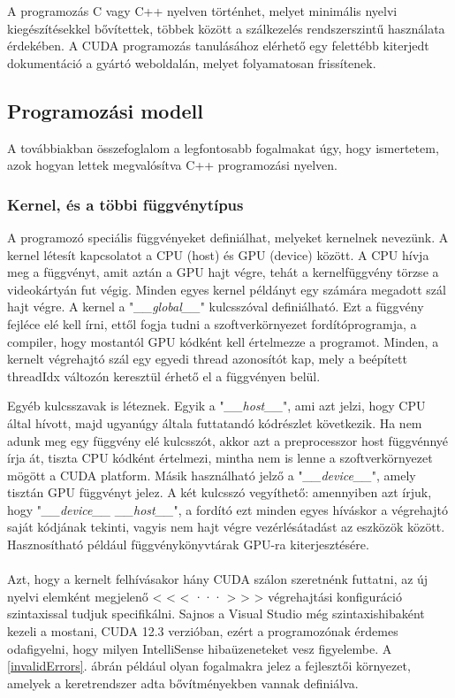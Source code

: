 A programozás C vagy C++ nyelven történhet, melyet minimális nyelvi kiegészítésekkel bővítettek, többek között a szálkezelés rendszerszintű használata érdekében. A CUDA programozás tanulásához elérhető egy felettébb kiterjedt dokumentáció a gyártó weboldalán, melyet folyamatosan frissítenek. \cite{CUDAdoc}

\subsection{Programozási modell }
A továbbiakban összefoglalom a legfontosabb fogalmakat úgy, hogy ismertetem, azok hogyan lettek megvalósítva C++ programozási nyelven.

\subsubsection{Kernel, és a többi függvénytípus}
A programozó speciális függvényeket definiálhat, melyeket kernelnek nevezünk. A kernel létesít kapcsolatot a CPU (host) és GPU (device) között. A CPU hívja meg a függvényt, amit aztán a GPU hajt végre, tehát a kernelfüggvény törzse a videokártyán fut végig. Minden egyes kernel példányt egy számára megadott szál hajt végre.
A kernel a "\textit{\_\_global\_\_}" kulcsszóval definiálható. Ezt a függvény fejléce elé kell írni, ettől fogja tudni a szoftverkörnyezet fordítóprogramja, a compiler, hogy mostantól GPU kódként kell értelmezze a programot. Minden, a kernelt végrehajtó szál egy egyedi thread azonosítót kap, mely a beépített threadIdx változón keresztül érhető el a függvényen belül.

Egyéb kulcsszavak is léteznek. Egyik a "\textit{\_\_host\_\_}", ami azt jelzi, hogy CPU által hívott, majd ugyanúgy általa futtatandó kódrészlet következik. Ha nem adunk meg egy függvény elé kulcsszót, akkor azt a preprocesszor host függvénnyé írja át, tiszta CPU kódként értelmezi, mintha nem is lenne a szoftverkörnyezet mögött a CUDA platform. Másik használható jelző a "\textit{\_\_device\_\_}", amely tisztán GPU függvényt jelez. A két kulcsszó vegyíthető: amennyiben azt írjuk, hogy "\textit{\_\_device\_\_ \_\_host\_\_}", a fordító ezt minden egyes híváskor a végrehajtó saját kódjának tekinti, vagyis nem hajt végre vezérlésátadást az eszközök között. Hasznosítható például függvénykönyvtárak GPU-ra kiterjesztésére.

\paragraph{}
Azt, hogy a kernelt felhívásakor hány CUDA szálon szeretnénk futtatni, az új nyelvi elemként megjelenő < < < ··· > > > végrehajtási konfiguráció szintaxissal tudjuk specifikálni. Sajnos a Visual Studio még szintaxishibaként kezeli a mostani, CUDA 12.3 verzióban, ezért a programozónak érdemes odafigyelni, hogy milyen IntelliSense hibaüzeneteket vesz figyelembe. A \ref{invalidErrors}. ábrán például olyan fogalmakra jelez a fejlesztői környezet, amelyek a keretrendszer adta bővítményekben vannak definiálva. 



